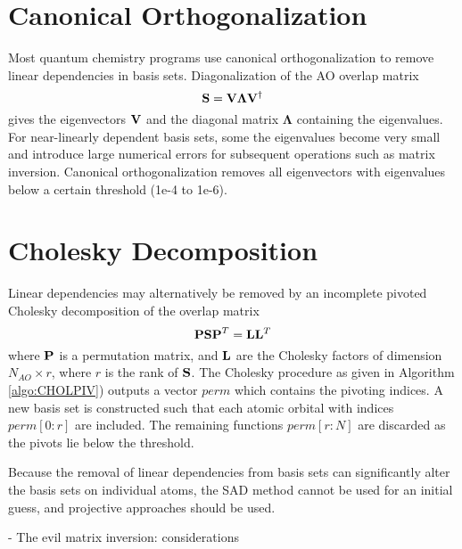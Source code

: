 \section{Canonical Orthogonalization}

Most quantum chemistry programs use canonical orthogonalization \cite{Low1956,Low1970} to remove linear dependencies in basis sets. Diagonalization of the AO overlap matrix
\begin{equation}
\mathbf{S} = \mathbf{V} \boldsymbol{\Lambda} \mathbf{V}^{\dagger}
\end{equation}
\noindent gives the eigenvectors $\mathbf{V}$ and the diagonal matrix $\boldsymbol{\Lambda}$ containing the eigenvalues. For near-linearly dependent basis sets, some the eigenvalues become very small and introduce large numerical errors for subsequent operations such as matrix inversion. Canonical orthogonalization removes all eigenvectors with eigenvalues below a certain threshold (1e-4 to 1e-6).

\section{Cholesky Decomposition}

Linear dependencies may alternatively be removed by an incomplete pivoted Cholesky decomposition of the overlap matrix \cite{Leh2019a} 
\begin{equation}
\mathbf{PSP}^T = \mathbf{L} \mathbf{L}^T
\end{equation}
\noindent where $\mathbf{P}$ is a permutation matrix, and $\mathbf{L}$ are the Cholesky factors of dimension $N_{AO} \times r$, where $r$ is the rank of $\mathbf{S}$. The Cholesky procedure as given in Algorithm \ref{algo:CHOLPIV}) outputs a vector $perm$ which contains the pivoting indices. A new basis set is constructed such that each atomic orbital with indices $perm[0:r]$ are included. The remaining functions $perm[r:N]$ are discarded as the pivots lie below the threshold. 

Because the removal of linear dependencies from basis sets can significantly alter the basis sets on individual atoms, the SAD method cannot be used for an initial guess, and projective approaches should be used.

- The evil matrix inversion: considerations
